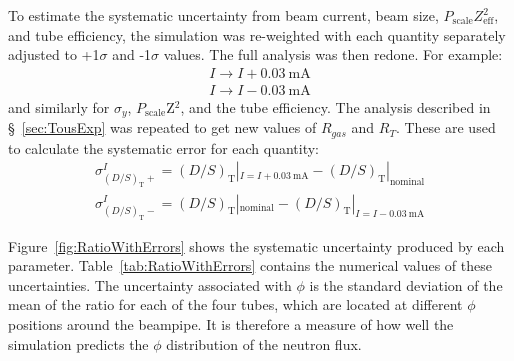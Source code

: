 To estimate the systematic uncertainty from beam current, beam size, $P_{\mathrm{scale}}Z_{\mathrm{eff}}^{2}$, and \he tube efficiency, the simulation was re-weighted with each quantity separately adjusted to +1$\sigma$ and -1$\sigma$ values. The full analysis was then redone. For example:
\begin{subequations}
\begin{align}
		{I\rightarrow I+0.03\mathrm{~mA}} \\
		{I\rightarrow I-0.03\mathrm{~mA}}
\end{align}
\end{subequations}
and similarly for $\sigma_{y}$, $P_{\mathrm{scale}}$Z$^{2}$, and the \he tube efficiency. The analysis described in \S~\ref{sec:TousExp} was repeated to get new values of $R_{gas}$ and $R_{T}$. These are used to calculate the systematic error for each quantity:
\begin{subequations}
\begin{align}
	{\sigma_{(D/S)_{\mathrm{T}}+}^{I} = (D/S)_{\mathrm{T}}|_{I=I+0.03\mathrm{~mA}} - (D/S)_{\mathrm{T}}|_{\mathrm{nominal}}} \\
	{\sigma_{(D/S)_{\mathrm{T}}-}^{I} = (D/S)_{\mathrm{T}}|_{\mathrm{nominal}} - (D/S)_{\mathrm{T}}|_{I=I-0.03\mathrm{~mA}} }
\end{align}
\end{subequations}

Figure~\ref{fig:RatioWithErrors} shows the systematic uncertainty produced by each parameter. Table~\ref{tab:RatioWithErrors} contains the numerical values of these uncertainties. The uncertainty associated with $\phi$ is the standard deviation of the mean of the ratio for each of the four \he tubes, which are located at different $\phi$ positions around the beampipe. It is therefore a measure of how well the simulation predicts the $\phi$ distribution of the neutron flux.

